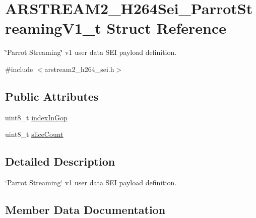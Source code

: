 \hypertarget{struct_a_r_s_t_r_e_a_m2___h264_sei___parrot_streaming_v1__t}{}\section{A\+R\+S\+T\+R\+E\+A\+M2\+\_\+\+H264\+Sei\+\_\+\+Parrot\+Streaming\+V1\+\_\+t Struct Reference}
\label{struct_a_r_s_t_r_e_a_m2___h264_sei___parrot_streaming_v1__t}


\char`\"{}\+Parrot Streaming\char`\"{} v1 user data S\+EI payload definition.  




{\ttfamily \#include $<$arstream2\+\_\+h264\+\_\+sei.\+h$>$}

\subsection*{Public Attributes}
\begin{DoxyCompactItemize}
\item 
uint8\+\_\+t \hyperlink{struct_a_r_s_t_r_e_a_m2___h264_sei___parrot_streaming_v1__t_abf3f238cf25c5696a3b7f742fdf41624}{index\+In\+Gop}
\item 
uint8\+\_\+t \hyperlink{struct_a_r_s_t_r_e_a_m2___h264_sei___parrot_streaming_v1__t_ab1000596ae4aed4d2dd5763fff495620}{slice\+Count}
\end{DoxyCompactItemize}


\subsection{Detailed Description}
\char`\"{}\+Parrot Streaming\char`\"{} v1 user data S\+EI payload definition. 

\subsection{Member Data Documentation}
